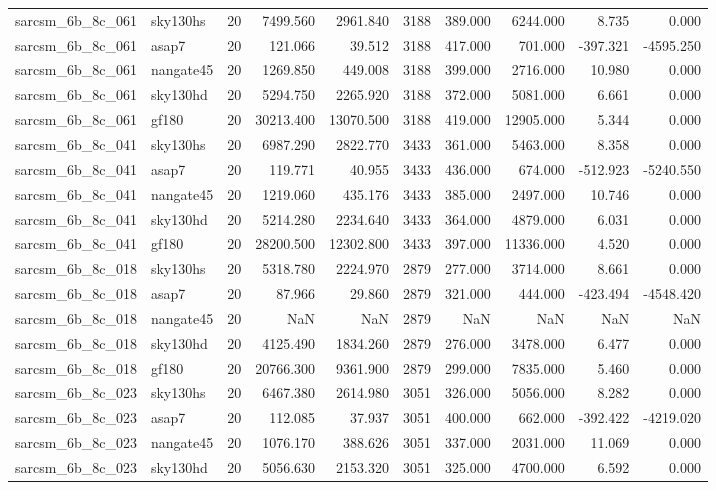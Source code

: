 \begin{tabular}{llrrrrrrrr}
sarcsm\_6b\_8c\_061 & sky130hs & 20 & 7499.560 & 2961.840 & 3188 & 389.000 & 6244.000 & 8.735 & 0.000 \\
sarcsm\_6b\_8c\_061 & asap7 & 20 & 121.066 & 39.512 & 3188 & 417.000 & 701.000 & -397.321 & -4595.250 \\
sarcsm\_6b\_8c\_061 & nangate45 & 20 & 1269.850 & 449.008 & 3188 & 399.000 & 2716.000 & 10.980 & 0.000 \\
sarcsm\_6b\_8c\_061 & sky130hd & 20 & 5294.750 & 2265.920 & 3188 & 372.000 & 5081.000 & 6.661 & 0.000 \\
sarcsm\_6b\_8c\_061 & gf180 & 20 & 30213.400 & 13070.500 & 3188 & 419.000 & 12905.000 & 5.344 & 0.000 \\
sarcsm\_6b\_8c\_041 & sky130hs & 20 & 6987.290 & 2822.770 & 3433 & 361.000 & 5463.000 & 8.358 & 0.000 \\
sarcsm\_6b\_8c\_041 & asap7 & 20 & 119.771 & 40.955 & 3433 & 436.000 & 674.000 & -512.923 & -5240.550 \\
sarcsm\_6b\_8c\_041 & nangate45 & 20 & 1219.060 & 435.176 & 3433 & 385.000 & 2497.000 & 10.746 & 0.000 \\
sarcsm\_6b\_8c\_041 & sky130hd & 20 & 5214.280 & 2234.640 & 3433 & 364.000 & 4879.000 & 6.031 & 0.000 \\
sarcsm\_6b\_8c\_041 & gf180 & 20 & 28200.500 & 12302.800 & 3433 & 397.000 & 11336.000 & 4.520 & 0.000 \\
sarcsm\_6b\_8c\_018 & sky130hs & 20 & 5318.780 & 2224.970 & 2879 & 277.000 & 3714.000 & 8.661 & 0.000 \\
sarcsm\_6b\_8c\_018 & asap7 & 20 & 87.966 & 29.860 & 2879 & 321.000 & 444.000 & -423.494 & -4548.420 \\
sarcsm\_6b\_8c\_018 & nangate45 & 20 & NaN & NaN & 2879 & NaN & NaN & NaN & NaN \\
sarcsm\_6b\_8c\_018 & sky130hd & 20 & 4125.490 & 1834.260 & 2879 & 276.000 & 3478.000 & 6.477 & 0.000 \\
sarcsm\_6b\_8c\_018 & gf180 & 20 & 20766.300 & 9361.900 & 2879 & 299.000 & 7835.000 & 5.460 & 0.000 \\
sarcsm\_6b\_8c\_023 & sky130hs & 20 & 6467.380 & 2614.980 & 3051 & 326.000 & 5056.000 & 8.282 & 0.000 \\
sarcsm\_6b\_8c\_023 & asap7 & 20 & 112.085 & 37.937 & 3051 & 400.000 & 662.000 & -392.422 & -4219.020 \\
sarcsm\_6b\_8c\_023 & nangate45 & 20 & 1076.170 & 388.626 & 3051 & 337.000 & 2031.000 & 11.069 & 0.000 \\
sarcsm\_6b\_8c\_023 & sky130hd & 20 & 5056.630 & 2153.320 & 3051 & 325.000 & 4700.000 & 6.592 & 0.000 \\

\end{tabular}
